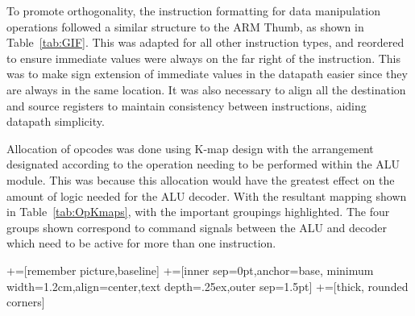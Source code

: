 To promote orthogonality, the instruction formatting for data manipulation operations followed a similar structure to the ARM Thumb, as shown in Table~\ref{tab:GIF}. 
This was adapted for all other instruction types, and reordered to ensure immediate values were always on the far right of the instruction. 
This was to make sign extension of immediate values in the datapath easier since they are always in the same location.
It was also necessary to align all the destination and source registers to maintain consistency between instructions, aiding datapath simplicity. 

Allocation of opcodes was done using K-map design with the arrangement designated according to the operation needing to be performed within the ALU module. 
This was because this allocation would have the greatest effect on the amount of logic needed for the ALU decoder. 
With the resultant mapping shown in Table~\ref{tab:OpKmaps}, with the important groupings highlighted. 
The four groups shown correspond to command signals between the ALU and decoder which need to be active for more than one instruction. 

\newcommand\tabnode[1]{\addtocounter{nodecount}{1} \tikz \node (\arabic{nodecount}) {#1};}

\newcommand\newcell[1]{\hspace{-0.5mm}\tabnode{#1}\hspace{-0.5mm}}

+=[remember picture,baseline]
+=[inner sep=0pt,anchor=base,
minimum width=1.2cm,align=center,text depth=.25ex,outer sep=1.5pt]
+=[thick, rounded corners]

\newcommand{\darkercolor}[3]{%
    \colorlet{#3}{#1!#2!black}
}
\darkercolor{green}{60}{darkgreen}

